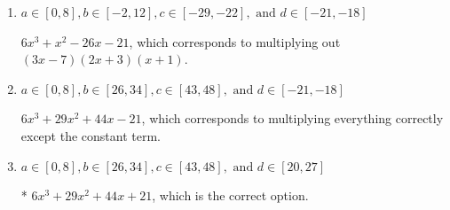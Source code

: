 \documentclass{extbook}[14pt]
\begin{document}
\begin{enumerate}
{\begin{enumerate}[label=\Alph*.]
$6x^{3} -29 x^{2} +44 x -21$, which corresponds to multiplying out $(3x -7)(2x -3)(x -1)$.
\item \( a \in [0, 8], b \in [-2, 12], c \in [-29, -22], \text{ and } d \in [-21, -18] \)

$6x^{3} + x^{2} -26 x -21$, which corresponds to multiplying out $(3x -7)(2x + 3)(x + 1)$.
\item \( a \in [0, 8], b \in [26, 34], c \in [43, 48], \text{ and } d \in [-21, -18] \)

$6x^{3} +29 x^{2} +44 x -21$, which corresponds to multiplying everything correctly except the constant term.
\item \( a \in [0, 8], b \in [26, 34], c \in [43, 48], \text{ and } d \in [20, 27] \)

* $6x^{3} +29 x^{2} +44 x + 21$, which is the correct option.
\end{enumerate}

}
\end{enumerate}
\end{document}
